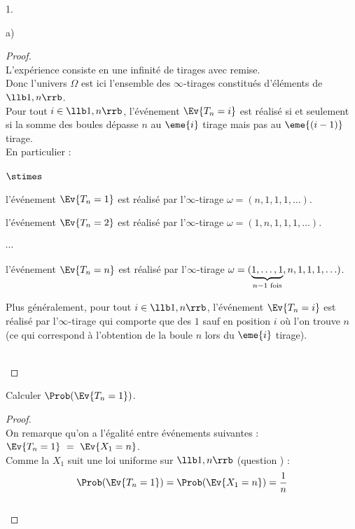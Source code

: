 \documentclass[11pt]{article}%
\begin{document}
\begin{noliste}{1.}
\begin{noliste}{a)}
    \begin{proof}~\\
      L'expérience consiste en une infinité de tirages avec 
      remise. \\
      Donc l'univers $\Omega$ est ici l'ensemble des 
      $\infty$-tirages constitués d'éléments de $\llb 1,n\rrb$.\\
      Pour tout $i\in \llb 1, n\rrb$, l'événement 
      $\Ev{T_n=i}$ est réalisé si et seulement si la somme des boules 
      dépasse $n$ au $\eme{i}$ tirage mais pas au $\eme{(i-1)}$ 
      tirage.\\
      En particulier :
      \begin{noliste}{$\stimes$}
      \item l'événement $\Ev{T_n=1}$ est réalisé par l'$\infty$-tirage
        $\omega=(n,1,1,1,\hdots)$.
      \item l'événement $\Ev{T_n=2}$ est réalisé par l'$\infty$-tirage
        $\omega=(1,n,1,1,1,\hdots)$.
      \item $\cdots$
      \item l'événement $\Ev{T_n=n}$ est réalisé par l'$\infty$-tirage
        $\omega=(\underbrace{1,\hdots,1}_{\scriptsize{n-1 \mbox{ 
              fois}}},n,1,1,1,\hdots)$.
      \end{noliste}
      Plus généralement, pour tout $i\in \llb 1, n\rrb$, l'événement
      $\Ev{T_n=i}$ est réalisé par l'$\infty$-tirage qui comporte que
      des $1$ sauf en position $i$ où l'on trouve $n$(ce qui
      correspond à l'obtention de la boule $n$ lors du $\eme{i}$
      tirage).%
      
      ~\\[-1.4cm]
    \end{proof}
    
  \item Calculer $\Prob(\Ev{T_n=1})$.
    
    \begin{proof}~\\
      On remarque qu'on a l'égalité entre événements suivantes :
      $
      \Ev{T_n=1} \ = \ \Ev{X_1=n}
      $.\\
      Comme la \var $X_1$ suit une loi uniforme 
      sur $\llb 1,n\rrb$ (question ) :
      \[
      \Prob(\Ev{T_n=1})=\Prob(\Ev{X_1=n})=\dfrac{1}{n}
      \]
      ~\\[-1cm]
    \end{proof}
    

\end{noliste}
\end{noliste}
\end{document}
